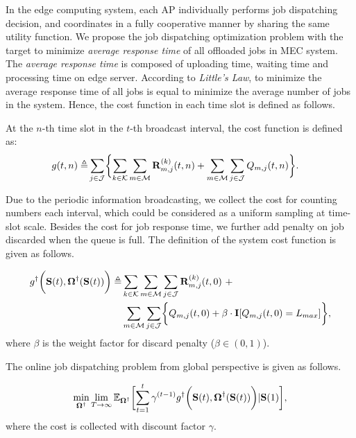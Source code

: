 In the edge computing system, each AP individually performs job dispatching decision, and coordinates in a fully cooperative manner by sharing the same utility function.
We propose the job dispatching optimization problem with the target to minimize \emph{average response time} of all offloaded jobs in MEC system.
The \emph{average response time} is composed of uploading time, waiting time and processing time on edge server.
According to \emph{Little's Law}, to minimize the average response time of all jobs is equal to minimize the average number of jobs in the system.
Hence, the cost function in each time slot is defined as follows.
\begin{definition}
    At the $n$-th time slot in the $t$-th broadcast interval, the cost function is defined as:
    \begin{align}
        g(t,n) \define & \sum_{j\in\jSpace}\Brace{
            \sum_{k\in\apSet}\sum_{m\in\esSet} \vec{R}^{(k)}_{m,j}(t,n) + \sum_{m\in\esSet}\sum_{j\in\jSpace} Q_{m,j}(t,n)
        }.
    \end{align}
\end{definition}

Due to the periodic information broadcasting, we collect the cost for counting numbers each interval, which could be considered as a uniform sampling at time-slot scale.
Besides the cost for job response time, we further add penalty on job discarded when the queue is full.
The definition of the system cost function is given as follows.
\begin{definition}
    \begin{align}
        g^{\dagger}\Paren{\Stat(t), \Policy^{\dagger}(\Stat(t))} \define
            &\sum_{k\in\apSet} \sum_{m\in\esSet} \sum_{j\in\jSpace} \vec{R}^{(k)}_{m,j}(t,0)~+
            \nonumber\\
            &\sum_{m\in\esSet} \sum_{j\in\jSpace} \Brace{Q_{m,j}(t,0) + \beta \cdot \mat{I}[Q_{m,j}(t,0)=L_{max}]},
    \end{align}
    where $\beta$ is the weight factor for discard penalty ($\beta \in (0,1)$).
\end{definition}

The online job dispatching problem from global perspective is given as follows.
\begin{problem}
    \begin{align}
        \min_{\Policy^{\dagger}} \lim_{T \to \infty}
            \mathbb{E}_{\Policy^{\dagger}}
                \Bracket{\sum_{t=1}^t \gamma^{(t-1)} g^{\dagger}\Paren{\Stat(t), \Policy^{\dagger}(\Stat(t))}|\Stat(1)},
    \end{align}
    where the cost is collected with discount factor $\gamma$.
\end{problem}

